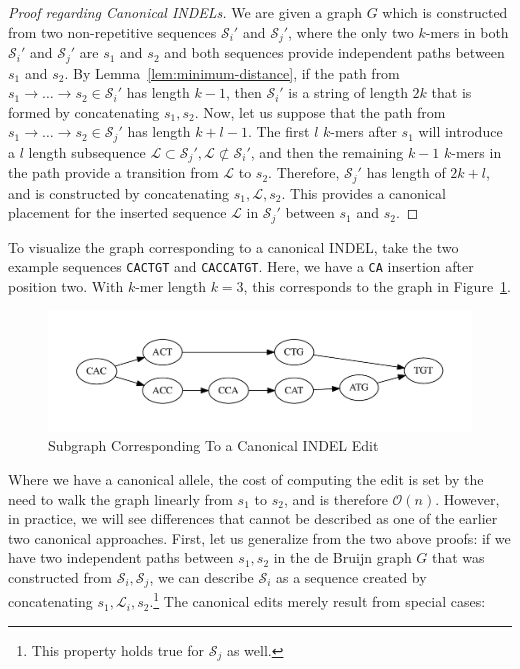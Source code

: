 \documentclass[phd]{ucbthesis}
\begin{document}
\begin{proof}[Proof regarding Canonical INDELs]
\label{proof:canonical-indels}
We are given a graph $G$ which is constructed from two non-repetitive sequences $\mathcal{S}_i'$ and
$\mathcal{S}_j'$, where the only two $k$-mers in both $\mathcal{S}_i'$ and $\mathcal{S}_j'$ are $s_1$
and $s_2$ and both sequences provide independent paths between $s_1$ and $s_2$. By
Lemma~\ref{lem:minimum-distance}, if the path from $s_1 \rightarrow \dots \rightarrow s_2 \in
\mathcal{S}_i'$ has length $k - 1$, then $\mathcal{S}_i'$ is a string of length $2k$ that is formed by
concatenating $s_1, s_2$. Now, let us suppose that the path from $s_1 \rightarrow \dots \rightarrow s_2
\in \mathcal{S}_j'$ has length $k + l - 1$. The first $l$ $k$-mers after $s_1$ will introduce a $l$ length
subsequence $\mathcal{L} \subset \mathcal{S}_j', \mathcal{L} \not\subset \mathcal{S}_i'$, and then the
remaining $k - 1$ $k$-mers in the path provide a transition from $\mathcal{L}$ to $s_2$. Therefore,
$\mathcal{S}_j'$ has length of $2k + l$, and is constructed by concatenating $s_1, \mathcal{L}, s_2$.
This provides a canonical placement for the inserted sequence $\mathcal{L}$ in $\mathcal{S}_j'$ between
$s_1$ and $s_2$.
\end{proof}

To visualize the graph corresponding to a canonical INDEL, take the two example sequences
\texttt{CACTGT} and \texttt{CACCATGT}. Here, we have a \texttt{CA} insertion after position two. With
$k$-mer length $k = 3$, this corresponds to the graph in Figure~\ref{fig:indel}.

\begin{figure}[h]
\begin{center}
\includegraphics[width=0.95\linewidth, clip=true, trim=0 39 0 39]{graphs/indel.pdf}
\end{center}
\caption{Subgraph Corresponding To a Canonical INDEL Edit}
\label{fig:indel}
\end{figure}

Where we have a canonical allele, the cost of computing the edit is set by the need to walk the graph
linearly from $s_1$ to $s_2$, and is therefore $\mathcal{O}(n)$. However, in practice, we will see
differences that cannot be described as one of the earlier two canonical approaches. First, let us
generalize from the two above proofs: if we have two independent paths between $s_1, s_2$ in the
de Bruijn graph $G$ that was constructed from $\mathcal{S}_i, \mathcal{S}_j$, we can describe
$\mathcal{S}_i$ as a sequence created by concatenating $s_1, \mathcal{L}_i, s_2$.\footnote{This
property holds true for $\mathcal{S}_j$ as well.} The canonical edits merely result from special cases:
\end{document}
